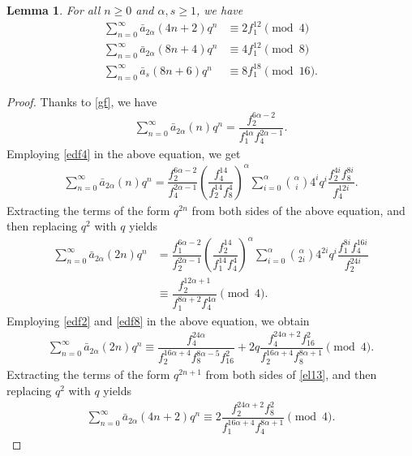 \documentclass[11pt,a4paper]{article}
\numberwithin{equation}{section}
\theoremstyle{plain}
\newtheorem{lemma}[theorem]{Lemma}
\begin{document}
	\begin{lemma}\label{lgf3}
	For all $n\ge0$ and $\alpha, s\ge 1$, we have
	\begin{align}
		\sum_{n=0}^{\infty}\bar{a}_{2\alpha}(4n+2)q^n&\equiv 2f_1^{12}\pmod 4\label{e4n2e}\\
		\sum_{n=0}^{\infty}\bar{a}_{2\alpha}(8n+4)q^n&\equiv 4f_1^{12}\pmod{8}\label{e8n4e}\\
		\sum_{n=0}^{\infty}\bar{a}_{s}(8n+6)q^n&\equiv 8f_1^{18}\pmod{16}\label{e8n6}.
	\end{align}
	\end{lemma}
\begin{proof}
	Thanks to \eqref{gf}, we have
	\begin{align*}
	\sum_{n=0}^{\infty}\bar{a}_{2\alpha}(n)q^n=\dfrac{f_2^{6\alpha-2}}{f_1^{4\alpha}f_4^{2\alpha-1}}.
	\end{align*}
	Employing \eqref{edf4} in the above equation, we get
	\begin{align*}
	\sum_{n=0}^{\infty}\bar{a}_{2\alpha}(n)q^n=\dfrac{f_2^{6\alpha-2}}{f_4^{2\alpha-1}}\left(\dfrac{f_4^{14}}{f_2^{14}f_8^4}\right)^\alpha \sum_{i=0}^{\alpha}\binom{\alpha}{i}4^iq^i\dfrac{f_2^{4i}f_8^{8i}}{f_4^{12i}}.
	\end{align*}
	Extracting the terms of the form $q^{2n}$ from both sides of the above equation, and then replacing $q^{2}$ with $q$ yields
		\begin{align*}
			\sum_{n=0}^{\infty}\bar{a}_{2\alpha}(2n)q^n&=\dfrac{f_1^{6\alpha-2}}{f_2^{2\alpha-1}}\left(\dfrac{f_2^{14}}{f_1^{14}f_4^4}\right)^\alpha 
			\sum_{i=0}^{\alpha}\binom{\alpha}{2i}4^{2i}q^i\dfrac{f_1^{8i}f_4^{16i}}{f_2^{24i}}\\
			&\equiv\dfrac{f_2^{12\alpha+1}}{f_1^{8\alpha+2}f_4^{4\alpha}}\pmod 4.
		\end{align*}
		Employing \eqref{edf2} and \eqref{edf8} in the above equation, we obtain
		\begin{align}\label{el13}
			\sum_{n=0}^{\infty}\bar{a}_{2\alpha}(2n)q^n\equiv \dfrac{f_4^{24\alpha}}{f_2^{16\alpha+4}f_8^{8\alpha-5}f_{16}^2}+2q\dfrac{f_4^{24\alpha+2}f_{16}^2}{f_2^{16\alpha+4}f_8^{8\alpha+1}}\pmod 4.
		\end{align}
		Extracting the terms of the form $q^{2n+1}$ from both sides of \eqref{el13}, and then replacing $q^{2}$ with $q$ yields
		\begin{align}\label{el14}
		\sum_{n=0}^{\infty}\bar{a}_{2\alpha}(4n+2)q^n\equiv 2\dfrac{f_2^{24\alpha+2}f_8^2}{f_1^{16\alpha+4}f_4^{8\alpha+1}}\pmod 4.
		\end{align}

\end{proof}
\end{document}
